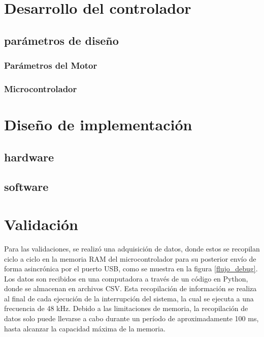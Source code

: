 \documentclass[11pt]{report}
\begin{document}

\chapter{Desarrollo del controlador}
\section{parámetros de diseño}
\subsection{Parámetros del Motor}
\subsection{Microcontrolador}


\chapter{Diseño de implementación}
\section{hardware}
\section{software}

\chapter{Validación}
Para las validaciones, se realizó una adquisición de datos, donde estos se recopilan ciclo a ciclo en la memoria RAM del microcontrolador para su posterior envío de forma asincrónica por el puerto USB, como se muestra en la figura \ref{flujo_debug}. Los datos son recibidos en una computadora a través de un código en Python, donde se almacenan en archivos CSV. Esta recopilación de información se realiza al final de cada ejecución de la interrupción del sistema, la cual se ejecuta a una frecuencia de 48 kHz. Debido a las limitaciones de memoria, la recopilación de datos solo puede llevarse a cabo durante un período de aproximadamente 100 ms, hasta alcanzar la capacidad máxima de la memoria.
\end{document}
